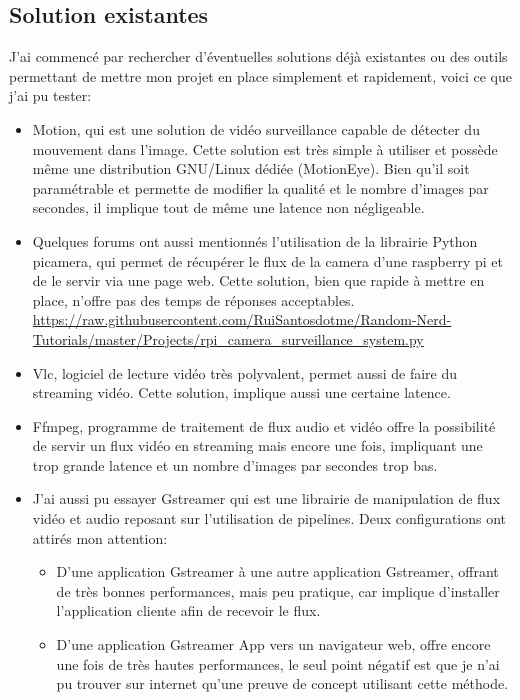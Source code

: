 \documentclass[12pt, a4paper]{report}
\begin{document}
\subsection{Solution existantes}
J'ai commencé par rechercher d'éventuelles solutions déjà existantes ou des outils permettant de mettre mon projet en place simplement et rapidement, voici ce que j'ai pu tester:\newline
\begin{itemize}
    \item Motion, qui est une solution de vidéo surveillance capable de détecter du mouvement dans l'image. Cette solution est très simple à utiliser et possède même une distribution GNU/Linux dédiée (MotionEye). Bien qu'il soit paramétrable et permette de modifier la qualité et le nombre d'images par secondes, il implique tout de même une latence non négligeable.\newline

    \item Quelques forums ont aussi mentionnés l'utilisation de la librairie Python picamera, qui permet de récupérer le flux de la camera d'une raspberry pi et de le servir via une page web. Cette solution, bien que rapide à mettre en place, n'offre pas des temps de réponses acceptables.\newline
        \url{https://raw.githubusercontent.com/RuiSantosdotme/Random-Nerd-Tutorials/master/Projects/rpi_camera_surveillance_system.py}\newline

    \item Vlc, logiciel de lecture vidéo très polyvalent, permet aussi de faire du streaming vidéo. Cette solution, implique aussi une certaine latence.\newline

    \item Ffmpeg, programme de traitement de flux audio et vidéo offre la possibilité de servir un flux vidéo en streaming mais encore une fois, impliquant une trop grande latence et un nombre d'images par secondes trop bas.\newline

    \item{J'ai aussi pu essayer Gstreamer qui est une librairie de manipulation de flux vidéo et audio reposant sur l'utilisation de pipelines. Deux configurations ont attirés mon attention:\newline
        \begin{itemize}
            \item D'une application Gstreamer à une autre application Gstreamer, offrant de très bonnes performances, mais peu pratique, car implique d'installer l'application cliente afin de recevoir le flux.\newline
            \item D'une application Gstreamer App vers un navigateur web, offre encore une fois de très hautes performances, le seul point négatif est que je n'ai pu trouver sur internet qu'une preuve de concept utilisant cette méthode.\newline
        \end{itemize}
        }
\end{itemize}
\end{document}
